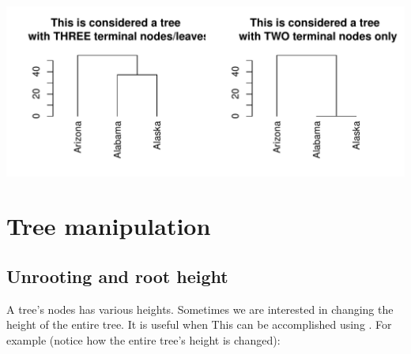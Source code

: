 \documentclass[shortnames,nojss,article]{jss}\usepackage{graphicx, color}
\makeatletter
\def\maxwidth{ %
  \ifdim\Gin@nat@width>\linewidth
    \linewidth
  \else
    \Gin@nat@width
  \fi
}
\newenvironment{knitrout}{}{} %
\makeatother
\begin{document}
\begin{knitrout}
{\centering \includegraphics[width=\maxwidth]{figure/unnamed-chunk-19} 

}



\end{knitrout}



\section{Tree manipulation}

\subsection{Unrooting and root height}

A tree's nodes has various heights. Sometimes we are interested in changing the height of the entire tree. It is useful when This can be accomplished using . For example (notice how the entire tree's height is changed):
\end{document}
